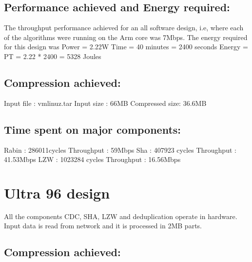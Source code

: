 \documentclass{article}
\begin{document}
\subsection{Performance achieved and Energy required:}
The throughput performance achieved for an all software design, i.e, where each of the algorithms were running on the Arm core was 7Mbps. 
\newline\newline 
The energy required for this design was 
Power = 2.22W 
\newline
Time = 40 minutes = 2400 seconds
\newline
Energy = PT = 2.22 * 2400 
\newline
       = 5328 Joules

\subsection{Compression achieved: }
    Input file : vmlinuz.tar       
    \newline
    Input size : 66MB
    \newline
    Compressed size: 36.6MB
    \newline\newline

\subsection{Time spent on major components:}

Rabin : 286011cycles
\newline
        Throughput : 59Mbps
\newline\newline
Sha : 407923 cycles
\newline
      Throughput : 41.53Mbps
\newline\newline
LZW : 1023284 cycles
\newline
Throughput : 16.56Mbps
\newline


\section{Ultra 96 design}

All the components CDC, SHA, LZW and deduplication operate in hardware. 
Input data is read from network and it is processed in 2MB parts. 


\subsection{Compression achieved:}
\end{document}
